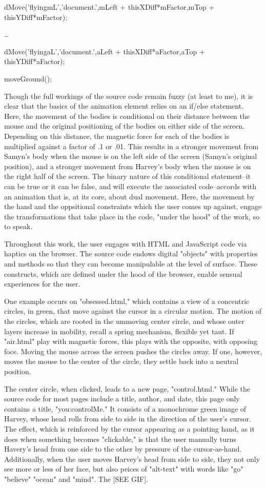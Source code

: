 \documentclass[11pt]{article}
\begin{document}
\begin{enumerate}
\begin{SOURCE}
dMove('flyingmL','document.',mLeft + thisXDiff*mFactor,mTop + 
thisYDiff*mFactor);

\ldots{}

dMove('flyingaL','document.',aLeft + thisXDiff*aFactor,aTop + thisYDiff*aFactor);

moveGround();
\end{SOURCE}

Though the full workings of the source code remain fuzzy (at least to
me), it is clear that the basics of the animation element relies on an
if/else statement. Here, the movement of the bodies is conditional on
their distance between the mouse and the original positioning of the
bodies on either side of the screen. Depending on this distance, the
magnetic force for each of the bodies is multiplied against a factor
of .1 or .01. This results in a stronger movement from Samyn's body
when the mouse is on the left side of the screen (Samyn's original
position), and a stronger movement from Harvey's body when the mouse
is on the right half of the screen. The binary nature of this
conditional statement--it can be true or it can be false, and will
execute the associated code--accords with an animation that is, at its
core, about dual movement. Here, the movement by the hand and the
oppsitional constraints which the user comes up against, engage the
transformations that take place in the code, "under the hood" of the
work, so to speak.

Throughout this work, the user engages with HTML and JavaScript code
via haptics on the browser. The source code endows digital "objects"
with properties and methods so that they can become manipulable at the
level of surface. These constructs, which are defined under the hood
of the browser, enable sensual experiences for the user. 

One example occurs on "obsessed.html," which contains a view of a
concentric circles, in green, that move against the cursor in a
circular motion. The motion of the circles, which are rooted in the
ummoving center circle, and whose outer layers increase in mobility,
recall a spring mechanism, flexible yet taut. If "air.html" play with
magnetic forces, this plays with the opposite, with opposing
foce. Moving the mouse across the screen pushes the circles away. If
one, however, moves the mouse to the center of the circle, they settle
back into a neutral position.

The center circle, when clicked, leads to a new page, "control.html."
While the source code for most pages include a title, author, and
date, this page only contains a title, "you:controlMe." It consists of
a monochrome green image of Harvey, whose head rolls from side to side
in the direction of the user's cursor. The effect, which is reinforced
by the cursor appearing as a pointing hand, as it does when something
becomes "clickable," is that the user manually turns Havery's head
from one side to the other by pressure of the
cursor-as-hand. Additionally, when the user moves Harvey's head from
side to side, they not only see more or less of her face, but also
peices of "alt-text" with words like "go" "believe" "ocean" and
"mind". The [SEE GIF].


\end{enumerate}
\end{document}
